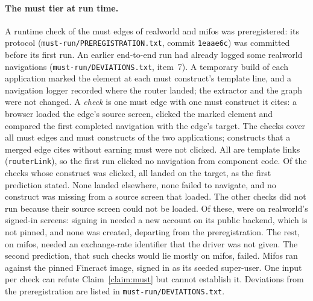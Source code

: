 \paragraph{The must tier at run time.} A runtime check of the must edges of realworld and mifos
was preregistered: its protocol (\texttt{must-run/PREREGISTRATION.txt}, commit \texttt{1eaae6c})
was committed before its first run. An earlier end-to-end run had already logged some realworld
navigations (\texttt{must-run/DEVIATIONS.txt}, item~7). A temporary build of each application marked the element at each must construct's
template line, and a navigation logger recorded where the router landed; the extractor and the
graph were not changed. A \emph{check} is one must edge with one must construct it cites: a
browser loaded the edge's source screen, clicked the marked element and compared the first
completed navigation with the edge's target. The \MustRunAllChecks{} checks cover all
\MustRunAllEdges{} must edges and \MustRunAllConstructs{} must constructs of the two applications;
constructs that a merged edge cites without earning must were not clicked. All
\MustRunAllConstructs{} are template links (\texttt{routerLink}), so the first run clicked no
navigation from component code. Of the \MustRunAllTriggered{} checks whose construct was clicked,
all \MustRunAllConfirmed{} landed on the target, as the first prediction stated. None landed
elsewhere, none failed to navigate, and no construct was missing from a source screen that loaded. The other
\MustRunAllUnreached{} checks did not run because their source screen could not be loaded.
Of these, \MustRunRealworldUnreached{} were on realworld's signed-in screens: signing in needed a new account
on its public backend, which is not pinned, and none was created, departing from the
preregistration. The rest, on mifos, needed an exchange-rate identifier that the driver was not
given. The second prediction, that such checks would lie mostly on mifos,
failed. Mifos ran against the pinned Fineract image, signed in as its seeded super-user. One input
per check can refute Claim~\ref{claim:must} but cannot establish it. Deviations from the
preregistration are listed in \texttt{must-run/DEVIATIONS.txt}.

